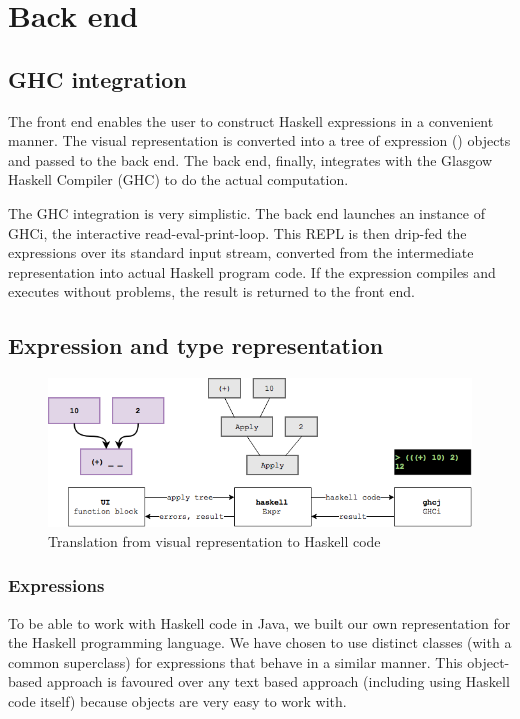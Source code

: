 \section{Back end}

\subsection{GHC integration}

The front end enables the user to construct Haskell expressions in a convenient manner.
The visual representation is converted into a tree of expression () objects and passed to the back end. 
The back end, finally, integrates with the Glasgow Haskell Compiler (\gls{GHC}) to do the actual computation.

The GHC integration is very simplistic.
The back end launches an instance of GHCi, the interactive read-eval-print-loop. 
This \gls{REPL} is then drip-fed the expressions over its standard input stream, converted from the intermediate representation into actual Haskell program code.
If the expression compiles and executes without problems, the result is returned to the front end.

\subsection{Expression and type representation}

\begin{figure}[h]
	\centering
	\includegraphics[scale=0.5]{Images/exprtohaskell}
	\caption{Translation from visual representation to Haskell code}
	\label{fig:exprtohaskell}
\end{figure}

\subsubsection{Expressions}
 

To be able to work with Haskell code in Java, we built our own representation for the Haskell programming language.
We have chosen to use distinct classes (with a common superclass) for expressions that behave in a similar manner.
This object-based approach is favoured over any text based approach (including using Haskell code itself) because objects are very easy to work with.

